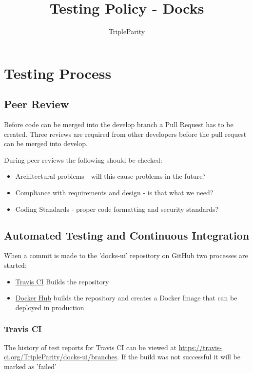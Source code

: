 \documentclass[]{article}
\title{Testing Policy - Docks}
\author{TripleParity}
\date{}
\begin{document}
\maketitle

\tableofcontents

\section{Testing Process}

\subsection{Peer Review}
Before code can be merged into the develop branch a Pull Request has to be created.
Three reviews are required from other developers before the pull request
can be merged into develop.

During peer reviews the following should be checked:
\begin{itemize}
	\item Architectural problems - will this cause problems in the future?
	\item Compliance with requirements and design - is that what we need?
	\item Coding Standards - proper code formatting and security standards?
\end{itemize}

\subsection{Automated Testing and Continuous Integration}
When a commit is made to the 'docks-ui' repository on GitHub two
processes are started:
\begin{itemize}
	\item \href{https://travis-ci.org/TripleParity/docks-ui/branches}{Travis CI} Builds the repository
	\item \href{https://hub.docker.com/r/tripleparity/docks-ui/builds/}{Docker Hub} builds the repository and creates a Docker Image that can be deployed in production
\end{itemize}

\subsubsection{Travis CI}
The history of test reports for Travis CI can be viewed at \url{https://travis-ci.org/TripleParity/docks-ui/branches}.
If the build was not successful it will be marked as 'failed'
\end{document}
